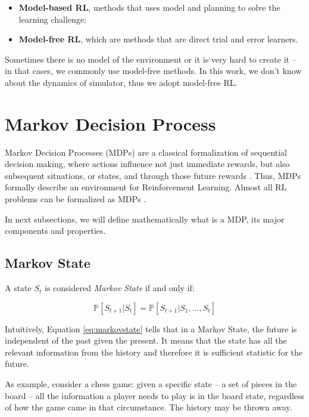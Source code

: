 \begin{itemize}
	\item \textbf{Model-based RL}, methods that uses model and planning to solve the learning challenge;
	\item \textbf{Model-free RL}, which are methods that are direct trial and error learners.
\end{itemize}

Sometimes there is no model of the environment or it is very hard to create it -- in that cases, we commonly use model-free methods. In this work, we don't know about the dynamics of simulator, thus we adopt model-free RL.

\section{Markov Decision Process}

 Markov Decision Processes (MDPs) are a classical
formalization of sequential decision making, where actions influence not just immediate rewards, but also
subsequent situations, or states, and through those future rewards \cite{sutton1998rli}. Thus, MDPs formally describe an environment for Reinforcement Learning. Almost all RL problems can be formalized as MDPs \cite{davidsilverlec2}.

In next subsections, we will define mathematically what is a MDP, its major components and properties.

\subsection{Markov State}\label{sec:markovstate}

A state $S_{t}$ is considered \textit{Markov State} if and only if:

\begin{equation}\label{eq:markovstate}
	\mathbb{P}[S_{t+1} | S_{t}] = \mathbb{P}[S_{t+1} | S_{1},\dots, S_{t}]
\end{equation}

Intuitively, Equation \ref{eq:markovstate} tells that in a Markov State, the future is independent of the past given the present. It means that the state has all the relevant information from the history and therefore it is sufficient statistic for the future. 

As example, consider a chess game: given a specific state -- a set of pieces in the board -- all the information a player needs to play is in the board state, regardless of how the game came in that circumstance. The history may be thrown away.

